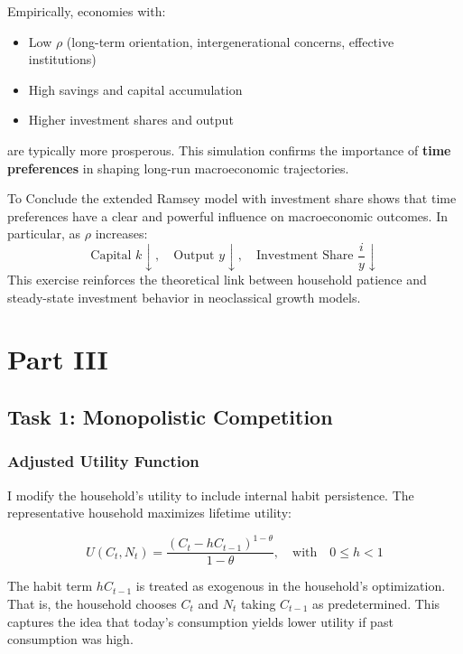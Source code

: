 \documentclass[12pt,a4paper,notitlepage]{article}
\numberwithin{equation}{section}
\begin{document}
\begin{itemize}
\begin{itemize}
\vspace{1em}

Empirically, economies with:
\begin{itemize}
    \item Low $\rho$ (long-term orientation, intergenerational concerns, effective institutions)
    \item High savings and capital accumulation
    \item Higher investment shares and output
\end{itemize}
are typically more prosperous. This simulation confirms the importance of \textbf{time preferences} in shaping long-run macroeconomic trajectories.

\vspace{1em}

To Conclude the extended Ramsey model with investment share shows that time preferences have a clear and powerful influence on macroeconomic outcomes. In particular, as $\rho$ increases:
\[
\text{Capital } k \downarrow, \quad \text{Output } y \downarrow, \quad \text{Investment Share } \frac{i}{y} \downarrow
\]
This exercise reinforces the theoretical link between household patience and steady-state investment behavior in neoclassical growth models.


\newpage
\section {Part III}

\subsection{Task 1: Monopolistic Competition}
\subsubsection{   Adjusted Utility Function}


I modify the household’s utility to include internal habit persistence. The representative household maximizes lifetime utility:

\[
U(C_t, N_t) = \frac{(C_t - h C_{t-1})^{1 - \theta}}{1 - \theta}, \quad \text{with} \quad 0 \leq h < 1
\]

The habit term $h C_{t-1}$ is treated as exogenous in the household's optimization. That is, the household chooses $C_t$ and $N_t$ taking $C_{t-1}$ as predetermined. This captures the idea that today’s consumption yields lower utility if past consumption was high.


\end{itemize}
\end{itemize}
\end{document}
